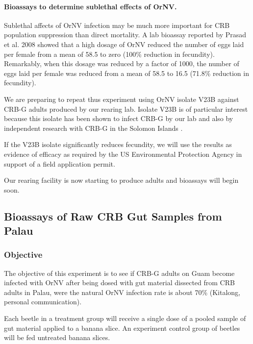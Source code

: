 \documentclass[12pt,letterpaper,english,bibliography=totocnumbered, abstract=on]{scrartcl}
\begin{document}
\paragraph{Bioassays to determine sublethal effects of OrNV.}

Sublethal affects of OrNV infection may be much more important for CRB population suppression than direct mortality. A lab bioassay reported by Prasad et al. 2008 \cite{prasadManagementCoconutRhinoceros2008} showed that a high dosage of OrNV reduced the number of eggs laid per female from a mean of 58.5 to zero (100\% reduction in fecundity). Remarkably, when this dosage was reduced by a factor of 1000, the number of eggs laid per female was reduced from a mean of 58.5 to 16.5 (71.8\% reduction in fecundity).

We are preparing to repeat thus experiment using OrNV isolate V23B against CRB-G adults produced by our rearing lab. Isolate V23B is of particular interest because this isolate has been shown to infect CRB-G by our lab and also by independent research with CRB-G in the Solomon Islands \cite{barreraElectronMicroscopyStudy2021}. 

If the V23B isolate significantly reduces fecundity, we will use the results as evidence of efficacy as required by the US Environmental Protection Agency in support of a field application permit.

Our rearing facility is now starting to produce adults and bioassays will begin soon.

\clearpage

\subsection{Bioassays of Raw CRB Gut Samples from Palau}

\subsubsection{Objective}

The objective of this experiment is to see if CRB-G adults on Guam become infected with OrNV after being dosed with gut material dissected from CRB adults in Palau, were the natural OrNV infection rate is about 70\% (Kitalong, personal communication).

Each beetle in a treatment group will receive a single dose of a pooled sample of gut material applied to a banana slice. An experiment control group of beetles will be fed untreated banana slices.
\end{document}
